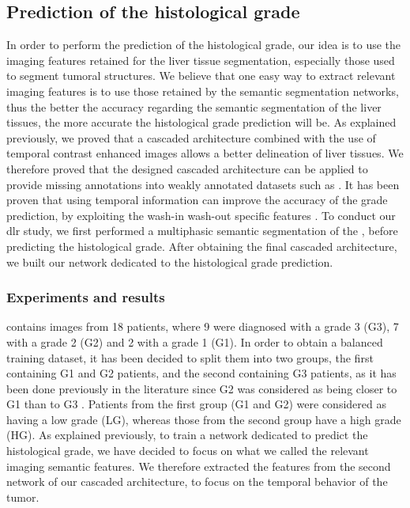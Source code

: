 \subsection{Prediction of the histological grade}\label{prediction-of-the-histological-grade-on-tcia-db}

In order to perform the prediction of the histological grade, our idea
is to use the imaging features retained for the liver tissue
segmentation, especially those used to segment tumoral structures.
We believe that one easy way to extract relevant imaging features is to
use those retained by the semantic segmentation networks, thus the
better the accuracy regarding the semantic segmentation of the liver
tissues, the more accurate the histological grade prediction will be.
As explained previously, we proved that a cascaded architecture combined
with the use of temporal contrast enhanced images allows a better
delineation of liver tissues. We therefore proved that the designed cascaded architecture can be applied to provide missing annotations into weakly annotated datasets such as \textbf{}.
It has been proven that using temporal information can improve the accuracy of the grade prediction, by exploiting the wash-in wash-out specific features \cite{Okamoto2012}.
To conduct our \ac{dlr} study, we first performed a multiphasic
semantic segmentation of the \textbf{}, before predicting the
histological grade.
After obtaining the final cascaded architecture, we built our network dedicated to the
histological grade prediction.

\subsubsection{Experiments and results}

 contains images from 18 patients, where 9 were diagnosed with a
grade 3 (G3), 7 with a grade 2 (G2) and 2 with a grade 1 (G1). In order
to obtain a balanced training dataset, it has been decided to split them
into two groups, the first containing G1 and G2 patients, and the second containing G3 patients, as it has been done previously in the literature since G2
was considered as being closer to G1 than to G3 \cite{Han2013,Zucman-Rossi2015}. Patients from the first group (G1 and G2) were considered as
having a low grade (LG), whereas those from the second group have a high
grade (HG).
As explained previously, to train a network dedicated to predict the
histological grade, we have decided to focus on what we called the
relevant imaging semantic features.
We therefore extracted the features from the second network of our
cascaded architecture, to focus on the temporal behavior of the tumor.

